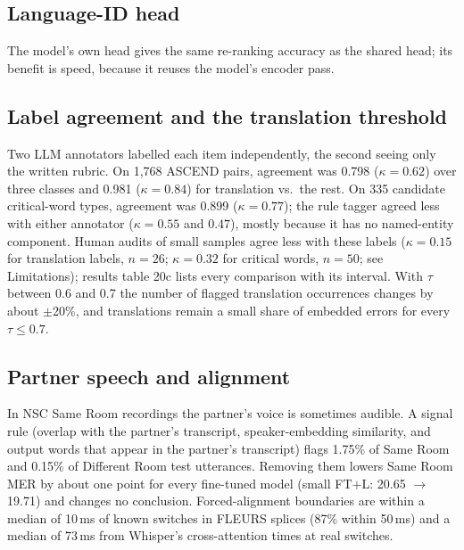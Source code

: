 \subsection{Language-ID head}\label{app:lid}
\begin{table}[h]
\centering
\small
\setlength{\tabcolsep}{3pt}
\caption{Language-ID head on validation (ASCEND / NSC). Accuracy on speech frames; median distance from a true switch to the nearest predicted one; share of switches detected.}
\label{tab:lid}
\end{table}
The model's own head gives the same re-ranking accuracy as the shared head; its benefit is speed, because it reuses the model's encoder pass.

\subsection{Label agreement and the translation threshold}\label{app:labels}
Two LLM annotators labelled each item independently, the second seeing only the written rubric. On 1{,}768 ASCEND pairs, agreement was 0.798 ($\kappa=0.62$) over three classes and 0.981 ($\kappa=0.84$) for translation vs.\ the rest. On 335 candidate critical-word types, agreement was 0.899 ($\kappa=0.77$); the rule tagger agreed less with either annotator ($\kappa=0.55$ and $0.47$), mostly because it has no named-entity component. Human audits of small samples agree less with these labels ($\kappa=0.15$ for translation labels, $n=26$; $\kappa=0.32$ for critical words, $n=50$; see Limitations); results table 20c lists every comparison with its interval. With $\tau$ between 0.6 and 0.7 the number of flagged translation occurrences changes by about $\pm$20\%, and translations remain a small share of embedded errors for every $\tau \le 0.7$.

\subsection{Partner speech and alignment}\label{app:partner}
In NSC Same Room recordings the partner's voice is sometimes audible. A signal rule (overlap with the partner's transcript, speaker-embedding similarity, and output words that appear in the partner's transcript) flags 1.75\% of Same Room and 0.15\% of Different Room test utterances. Removing them lowers Same Room MER by about one point for every fine-tuned model (small FT+L: 20.65 $\rightarrow$ 19.71) and changes no conclusion. Forced-alignment boundaries are within a median of 10\,ms of known switches in FLEURS splices (87\% within 50\,ms) and a median of 73\,ms from Whisper's cross-attention times at real switches.


